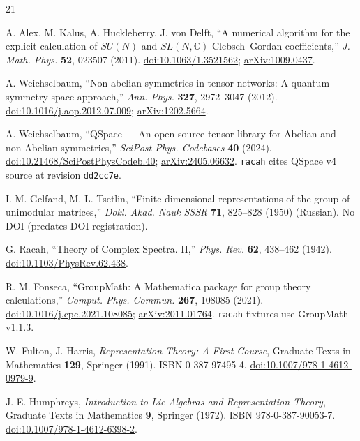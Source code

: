\documentclass[11pt,a4paper]{article}
\theoremstyle{plain}
\theoremstyle{definition}
\newcommand{\CC}{\mathbb{C}}
\newcommand{\code}[1]{\texttt{#1}}
\begin{document}
\begin{thebibliography}{21}

 A. Alex, M. Kalus, A. Huckleberry, J. von Delft,
``A numerical algorithm for the explicit calculation of $SU(N)$ and
$SL(N,\CC)$ Clebsch--Gordan coefficients,''
\emph{J. Math. Phys.} \textbf{52}, 023507 (2011).
\href{https://doi.org/10.1063/1.3521562}{doi:10.1063/1.3521562};
\href{https://arxiv.org/abs/1009.0437}{arXiv:1009.0437}.

 A. Weichselbaum,
``Non-abelian symmetries in tensor networks: A quantum symmetry space
approach,'' \emph{Ann. Phys.} \textbf{327}, 2972--3047 (2012).
\href{https://doi.org/10.1016/j.aop.2012.07.009}{doi:10.1016/j.aop.2012.07.009};
\href{https://arxiv.org/abs/1202.5664}{arXiv:1202.5664}.

 A. Weichselbaum,
``QSpace --- An open-source tensor library for Abelian and non-Abelian
symmetries,'' \emph{SciPost Phys. Codebases} \textbf{40} (2024).
\href{https://doi.org/10.21468/SciPostPhysCodeb.40}{doi:10.21468/SciPostPhysCodeb.40};
\href{https://arxiv.org/abs/2405.06632}{arXiv:2405.06632}.
\code{racah} cites QSpace v4 source at revision \code{dd2cc7e}.

 I. M. Gelfand, M. L. Tsetlin,
``Finite-dimensional representations of the group of unimodular matrices,''
\emph{Dokl. Akad. Nauk SSSR} \textbf{71}, 825--828 (1950) (Russian).
No DOI (predates DOI registration).

 G. Racah, ``Theory of Complex Spectra. II,''
\emph{Phys. Rev.} \textbf{62}, 438--462 (1942).
\href{https://doi.org/10.1103/PhysRev.62.438}{doi:10.1103/PhysRev.62.438}.

 R. M. Fonseca,
``GroupMath: A Mathematica package for group theory calculations,''
\emph{Comput. Phys. Commun.} \textbf{267}, 108085 (2021).
\href{https://doi.org/10.1016/j.cpc.2021.108085}{doi:10.1016/j.cpc.2021.108085};
\href{https://arxiv.org/abs/2011.01764}{arXiv:2011.01764}.
\code{racah} fixtures use GroupMath v1.1.3.

 W. Fulton, J. Harris,
\emph{Representation Theory: A First Course},
Graduate Texts in Mathematics \textbf{129}, Springer (1991).
ISBN 0-387-97495-4.
\href{https://doi.org/10.1007/978-1-4612-0979-9}{doi:10.1007/978-1-4612-0979-9}.

 J. E. Humphreys,
\emph{Introduction to Lie Algebras and Representation Theory},
Graduate Texts in Mathematics \textbf{9}, Springer (1972).
ISBN 978-0-387-90053-7.
\href{https://doi.org/10.1007/978-1-4612-6398-2}{doi:10.1007/978-1-4612-6398-2}.


\end{thebibliography}
\end{document}
